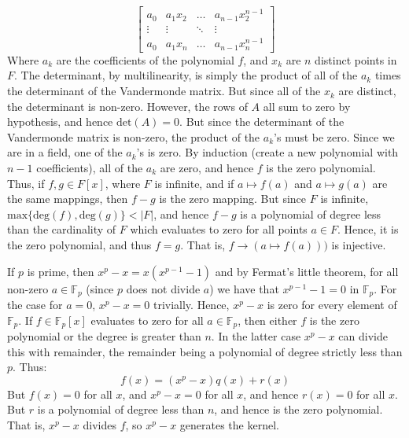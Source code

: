 \documentclass{article}                                                        %
\begin{document}
\begin{solution}
\begin{equation}
\begin{bmatrix}
                a_{0}&a_{1}x_{2}&\dots&a_{n-1}x_{2}^{n-1}\\
                \vdots&\vdots&\ddots&\vdots\\
                a_{0}&a_{1}x_{n}&\dots&a_{n-1}x_{n}^{n-1}
            \end{bmatrix}
        \end{equation}
        Where $a_{k}$ are the coefficients of the polynomial $f$, and
        $x_{k}$ are $n$ distinct points in $F$. The determinant, by
        multilinearity, is simply the product of all of the $a_{k}$ times the
        determinant of the Vandermonde matrix. But since all of the $x_{k}$
        are distinct, the determinant is non-zero. However, the rows of $A$ all
        sum to zero by hypothesis, and hence $\textrm{det}(A)=0$. But since the
        determinant of the Vandermonde matrix is non-zero, the product of the
        $a_{k}$'s must be zero. Since we are in a field, one of the $a_{k}$'s is
        zero. By induction (create a new polynomial with $n-1$ coefficients),
        all of the $a_{k}$ are zero, and hence $f$ is the zero polynomial.
        Thus, if $f,g\in{F}[x]$, where $F$ is infinite, and if
        $a\mapsto{f}(a)$ and $a\mapsto{g}(a)$ are the same mappings, then
        $f-g$ is the zero mapping. But since $F$ is infinite,
        $\textrm{max}\{\textrm{deg}(f),\textrm{deg}(g)\}<|F|$, and hence
        $f-g$ is a polynomial of degree less than the cardinality of $F$ which
        evaluates to zero for all points $a\in{F}$. Hence, it is the zero
        polynomial, and thus $f=g$. That is, $f\rightarrow(a\mapsto{f}(a)))$ is
        injective.
        \par\hfill\par
        If $p$ is prime, then $x^{p}-x=x(x^{p-1}-1)$ and by Fermat's little
        theorem, for all non-zero $a\in\mathbb{F}_{p}$ (since $p$ does not
        divide $a$) we have that $x^{p-1}-1=0$ in $\mathbb{F}_{p}$. For the case
        for $a=0$, $x^{p}-x=0$ trivially. Hence, $x^{p}-x$ is zero for every
        element of $\mathbb{F}_{p}$. If $f\in\mathbb{F}_{p}[x]$ evaluates to
        zero for all $a\in\mathbb{F}_{p}$, then either $f$ is the zero
        polynomial or the degree is greater than $n$. In the latter case
        $x^{p}-x$ can divide this with remainder, the remainder being a
        polynomial of degree strictly less than $p$. Thus:
        \begin{equation}
            f(x)=(x^{p}-x)q(x)+r(x)
        \end{equation}
        But $f(x)=0$ for all $x$, and $x^{p}-x=0$ for all $x$, and hence
        $r(x)=0$ for all $x$. But $r$ is a polynomial of degree less than $n$,
        and hence is the zero polynomial. That is, $x^{p}-x$ divides $f$, so
        $x^{p}-x$ generates the kernel.
    \end{solution}
\end{document}
